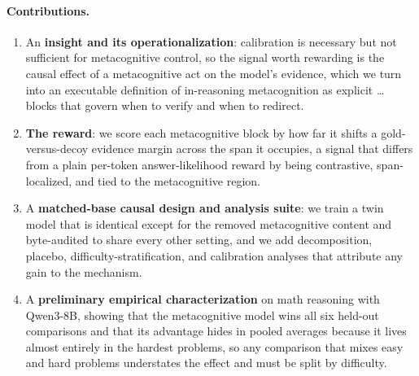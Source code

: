 \paragraph{Contributions.}
\begin{enumerate}
\item An \textbf{insight and its operationalization}: calibration is necessary
  but not sufficient for metacognitive control, so the signal worth rewarding is
  the causal effect of a metacognitive act on the model's evidence, which we turn
  into an executable definition of in-reasoning metacognition as explicit
  \metaopen{}\dots\metaclose{} blocks that govern when to verify and when to
  redirect.
\item \textbf{The \pmishift{} reward}: we score each metacognitive block by how
  far it shifts a gold-versus-decoy evidence margin across the span it occupies,
  a signal that differs from a plain per-token answer-likelihood reward by being
  contrastive, span-localized, and tied to the metacognitive region.
\item A \textbf{matched-base causal design and analysis suite}: we train a twin
  model that is identical except for the removed metacognitive content and
  byte-audited to share every other setting, and we add decomposition, placebo,
  difficulty-stratification, and calibration analyses that attribute any gain to
  the mechanism.
\item A \textbf{preliminary empirical characterization} on math reasoning with
  Qwen3-8B, showing that the metacognitive model wins all six held-out
  comparisons and that its advantage hides in pooled averages because it lives
  almost entirely in the hardest problems, so any comparison that mixes easy and
  hard problems understates the effect and must be split by difficulty.
\end{enumerate}
